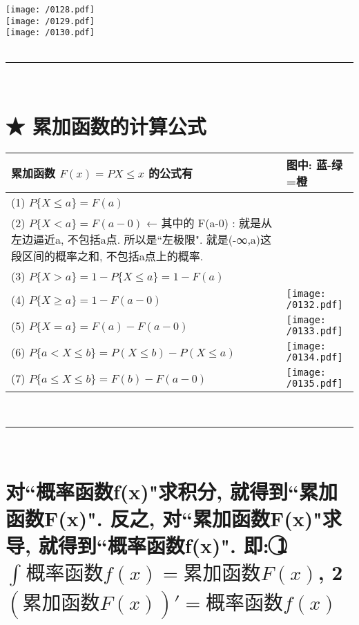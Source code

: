 \documentclass[UTF8]{ctexart}
\begin{document}
\texttt{[image: /0128.pdf]} \\

\texttt{[image: /0129.pdf]} \\

\texttt{[image: /0130.pdf]} \\


~\\
\hrule
~\\


\section{ ★  累加函数的计算公式}

\begin{tabular}{|p{}|p{}|}
	\hline
	累加函数 $F(x)=P{X \leq x}$ 的公式有 & 图中: 蓝-绿=橙 \\
	\hline
	 (1) $P\{X \leq a\} = F(a)$ &  \\ \hline
	 (2)  $P\{X < a\} = F(a-0)$ ← 其中的 F(a-0) : 就是从左边逼近a, 不包括a点. 所以是``左极限". 就是(-∞,a)这段区间的概率之和, 不包括a点上的概率.  &  \\ \hline
	 (3) $P\{X > a\} = 1- P\{X \leq a\} = 1- F(a)$ &  \\ \hline
	 (4) $P\{X \geq a\} = 1- F(a-0)$ & \texttt{[image: /0132.pdf]}
	  \\ \hline
	 (5) $P\{X=a\} = F(a) - F(a-0)$ &  \texttt{[image: /0133.pdf]}\\ \hline
	 (6) $P\{a < X \leq b\} = P(X \leq b) - P(X \leq a)$ &    \texttt{[image: /0134.pdf]}\\ \hline
	 (7) $P\{a \leq X \leq b\} = F(b) - F(a-0)$ &   \texttt{[image: /0135.pdf]} \\ \hline
\end{tabular}


~\\
\hrule
~\\



\section{ 对``概率函数f(x)"求积分, 就得到``累加函数F(x)". 反之, 对``累加函数F(x)"求导, 就得到``概率函数f(x)". 即: \textcircled{1}  $\int_{}^{}{\text{概率函数}f\left( x \right)}=\text{累加函数}F\left( x \right) $, \textcircled{2}
	$\left( \text{累加函数}F\left( x \right) \right) '=\text{概率函数}f\left( x \right) $}
\end{document}
